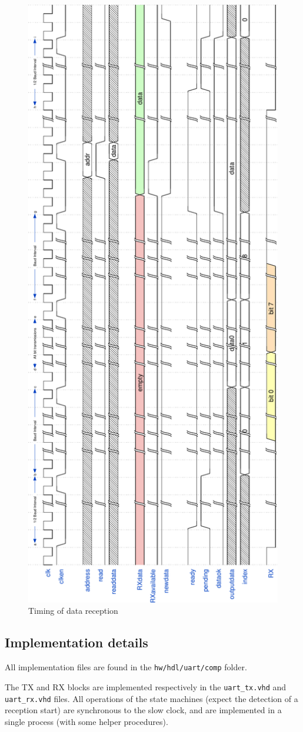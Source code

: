 \documentclass[12pt,a4paper]{article}
\begin{document}
\begin{figure}[p]
	\centering
	\includegraphics[width=.6\textwidth]{timings/RX_rot}
	\caption{Timing of data reception}
	\label{fig:timerx}
\end{figure}


\subsection{Implementation details}

All implementation files are found in the \texttt{hw/hdl/uart/comp} folder.

The TX and RX blocks are implemented respectively in the \texttt{uart\_tx.vhd} and \texttt{uart\_rx.vhd} files. All operations of the state machines (expect the detection of a reception start) are synchronous to the slow clock, and are implemented in a single process (with some helper procedures).
\end{document}

